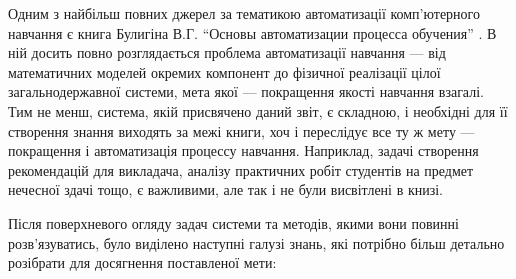Одним з найбільш повних джерел за тематикою автоматизації комп’ютерного навчання
є книга Булигіна В.Г. ``Основы автоматизации процесса обучения'' \cite{Bulygin}.
В ній досить повно розглядається проблема автоматизації навчання ---
від математичних моделей окремих компонент до фізичної реалізації цілої
загальнодержавної системи, мета якої --- покращення якості навчання взагалі.
Тим не менш, система, якій присвячено даний звіт, є складною, і необхідні для її
створення знання виходять за межі книги, хоч і переслідує все ту ж мету ---
покращення і автоматизація процессу навчання.
Наприклад, задачі створення рекомендацій для викладача, аналізу практичних робіт
студентів на предмет нечесної здачі тощо, є важливими, але так і не були
висвітлені в книзі.

Після поверхневого огляду задач системи та методів, якими вони повинні
розв’язуватись, було виділено наступні галузі знань, які потрібно більш детально
розібрати для досягнення поставленої мети:

